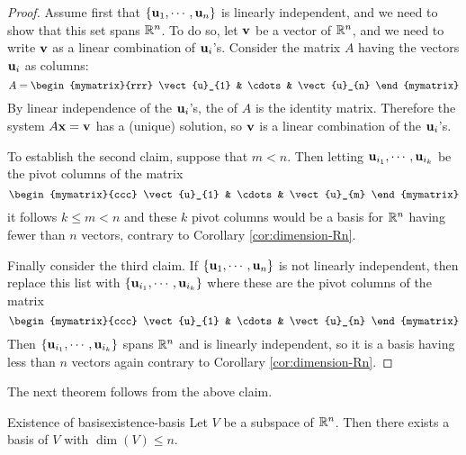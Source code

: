 \begin{proof}
Assume first that $\left\{\mbox{\bf u}_{1},\cdots ,\mbox{\bf u}_{n}\right\} $
is linearly independent, and we need to show that this set spans
$\mathbb{R}^{n}$. To do so, let $\mbox{\bf v}$ be a vector of
$\mathbb{R}^{n}$, and we need to write $\mbox{\bf v}$ as a linear combination of $\mbox{\bf u}_i$'s. 
Consider the matrix $A$ having the vectors $\mbox{\bf u}_i$  as
columns:
\begin{equation*}
A = 
\begin{mymatrix}{rrr}
\vect{u}_{1} & \cdots & \vect{u}_{n} 
\end{mymatrix}
\end{equation*}
By linear independence of the $\mbox{\bf u}_i$'s, the {\rref} of $A$ is
the identity matrix.  Therefore the system $A\mbox{\bf x}=
\mbox{\bf v}$ has a (unique) solution, so $\mbox{\bf v}$ is a linear combination
of the $\mbox{\bf u}_i$'s.

To establish the second claim, suppose that $m<n.$ Then letting
$\mbox{\bf u}_{i_{1}},\cdots ,\mbox{\bf u}_{i_{k}}$ be the pivot columns of the
matrix
\begin{equation*}
\begin{mymatrix}{ccc}
\vect{u}_{1} & \cdots & \vect{u}_{m}
\end{mymatrix}
\end{equation*}
it follows $k\leq m<n$ and these $k$ pivot columns would be a basis
for $\mathbb{R}^{n}$ having fewer than $n$ vectors, contrary to
Corollary \ref{cor:dimension-Rn}.

Finally consider the third claim. If $\left\{\mbox{\bf u}_{1},\cdots
,\mbox{\bf u}_{n}\right\} $ is not linearly independent, then replace this
list with $\left\{\mbox{\bf u}_{i_{1}},\cdots ,\mbox{\bf u}_{i_{k}}\right\} $ where these
are the pivot columns of the matrix 
\begin{equation*}
\begin{mymatrix}{ccc}
\vect{u}_{1} & \cdots & \vect{u}_{n}
\end{mymatrix}
\end{equation*}
Then $\left\{\mbox{\bf u}_{i_{1}},\cdots ,\mbox{\bf u}_{i_{k}}\right\} $ spans
$\mathbb{R}^{n}$ and is linearly independent, so it is a basis having
less than $n$ vectors again contrary to Corollary \ref{cor:dimension-Rn}.
\end{proof}

The next theorem follows from the above claim.

\begin{theorem}{Existence of basis}{existence-basis}
Let $V$ be a subspace of $\mathbb{R}^n$. Then there exists a basis of $V$ with 
 $\dim(V)\leq n$.
\end{theorem}


